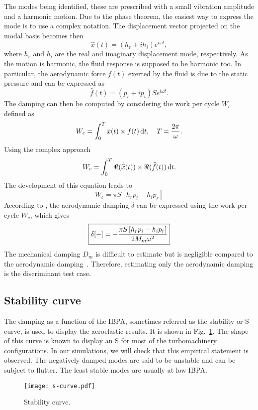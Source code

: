 The modes being identified, these are prescribed
with a small vibration amplitude and a harmonic motion.
Due to the phase theorem, the easiest way to express
the mode is to use a complex notation.
The displacement vector projected on the modal basis becomes then
\begin{equation}
   \widehat{x}(t) = (h_r + i h_i) e^{i \omega t},
   \label{eq:harm_vib_displ_vector}
\end{equation}
where $h_r$ and $h_i$ are the real and imaginary  displacement
mode, respectively.
As the motion is harmonic, the fluid response is
supposed to be harmonic too.
In particular, the aerodynamic force $f (t)$ exerted by the fluid is due to the
static pressure and can be expressed as
\begin{equation}
    \widehat{f}(t) = (p_r + i p_i) S e^{i \omega t}.
\end{equation}
The damping can then be computed by considering the 
work per cycle $W_c$ defined as
\begin{equation}
    W_c = \int_0^T \dot{x} (t) \times f(t) \mathop{}\!\mathrm{d} t, \quad T = \frac{2 \pi}{\omega}.
\end{equation}
Using the complex approach
\begin{equation}
    W_c = \int_0^T \Re (\dot{\widehat{x}} (t)) \times \Re (\widehat{f}(t)) \mathop{}\!\mathrm{d} t.
\end{equation}
The development of this equation leads to
\begin{equation}
    W_c = \pi S \left[h_r p_i - h_i p_r \right]
\end{equation}
According to \citet{Carta1967}, the aerodynamic 
damping $\delta$ can be expressed using the
work per cycle $W_c$, which gives
\begin{equation}
    \fbox{$
    \delta [-] = - \displaystyle \frac{\pi S \left[h_r p_i - h_i p_r \right]}{2 M_m \omega^2}
    $}
\end{equation}
The mechanical damping $D_m$ is difficult to estimate
but is negligible compared to the aerodynamic damping~\cite{Mikolajczak1975}.
Therefore, estimating only the aerodynamic damping is the discriminant test case.

\subsection{Stability curve}
\label{sub:s_curve}

The damping as a function of the IBPA, sometimes
referred as the stability or S curve, is used to
display the aeroelastic results. It is shown in
Fig.~\ref{fig:s-curve}. The shape of this curve is
known to display an S for most of the
turbomachinery configurations. 
In our simulations, we will check that this empirical
statement is observed.
The negatively damped modes are said to
be unstable and can be subject to flutter. 
The least stable modes are usually at low IBPA.
\begin{figure}[htp]
  \centering
  \texttt{[image: s-curve.pdf]}
  \caption{Stability curve.}
  \label{fig:s-curve}
\end{figure}
